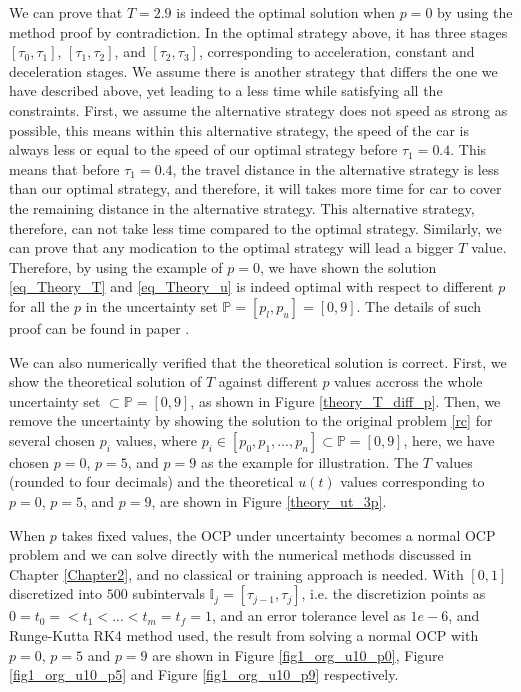 \documentclass  [
  paper    = a4,
  BCOR     = 10mm,
  twoside,
  fontsize = 12pt,
  fleqn,
  toc      = bibnumbered,
  toc      = listofnumbered,
  numbers  = noendperiod,
  headings = normal,
  listof   = leveldown,
  version  = 3.03
]                                       {scrreprt}
\newcommand{\<}{\langle}
\renewcommand{\>}{\rangle}
\begin{document}
We can prove that $T=2.9$ is indeed the optimal solution when $p=0$ by using the method proof by contradiction. In the optimal strategy above, it has three stages $[\tau_0, \tau_1]$, $[\tau_1, \tau_2]$, and $[\tau_2, \tau_3]$, corresponding to acceleration, constant and deceleration stages. We assume there is another strategy that differs the one we have described above, yet leading to a less time while satisfying all the constraints. First, we assume the alternative strategy does not speed as strong as possible, this means within this alternative strategy, the speed of the car is always less or equal to the speed of our optimal strategy before $\tau_1=0.4$. This means that before $\tau_1=0.4$, the travel distance in the alternative strategy is less than our optimal strategy, and therefore, it will takes more time for car to cover the remaining distance in the alternative strategy. This alternative strategy, therefore, can not take less time compared to the optimal strategy. Similarly, we can prove that any modication to the optimal strategy will lead a bigger $T$ value. Therefore, by using the example of $p=0$, we have shown the solution \ref{eq_Theory_T} and \ref{eq_Theory_u} is indeed optimal with respect to different $p$ for all the $p$ in the uncertainty set $ \mathbb{P}=[p_l, p_u] =[0,9]$. The details of such proof can be found in paper \cite{MatSch22}. 

We can also numerically verified that the theoretical solution is correct. First, we show the theoretical solution of $T$ against different $p$ values accross the whole uncertainty set $\subset \mathbb{P} = [0,9]$, as shown in Figure \ref{theory_T_diff_p}. Then, we remove the uncertainty by showing the solution to the original problem \ref{rc} for several chosen $p_i$ values, where $ p_i  \in [p_0, p_1, ..., p_n] \subset \mathbb{P} = [0,9]$, here, we have chosen $p=0$,  $p=5$,  and $p=9$ as the example for illustration.  The $T$ values (rounded to four decimals) and the theoretical  $u(t)$ values corresponding to $p=0$,  $p=5$,  and $p=9$, are shown in Figure \ref{theory_ut_3p}. 

When $p$ takes fixed values, the OCP under uncertainty becomes a normal OCP problem and we can solve directly with the numerical methods discussed in Chapter \ref{Chapter2}, and no classical or training approach is needed. With $[0,1]$ discretized into $500$ subintervals $\mathbb{I}_j = [\tau_{j-1}, \tau_j]$, i.e. the discretizion points as $0 = t_0 =  < t_1 < ... < t_m = t_f =1 $, and an error tolerance level as $1e-6$, and Runge-Kutta RK4 method used,  the result from solving a normal OCP with $p=0$, $p=5$ and $p=9$ are shown in Figure \ref{fig1_org_u10_p0}, Figure \ref{fig1_org_u10_p5} and Figure \ref{fig1_org_u10_p9} respectively. 
\end{document}
